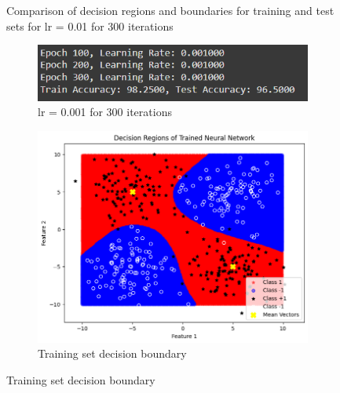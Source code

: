 \documentclass[a4paper,12pt]{article}
\begin{document}
\begin{figure}[H]
    \caption{Comparison of decision regions and boundaries for training and test sets for lr = 0.01 for 300 iterations}
\end{figure}

\begin{figure}[H]
    \centering
    \captionsetup[subfigure]{list=true} %

    \begin{subfigure}{0.5\textwidth}
        \centering
        \includegraphics[width=\textwidth]{3.3_.001_300_r.png}
        \caption{lr = 0.001 for 300 iterations}
    \end{subfigure}
    \begin{subfigure}{0.45\textwidth}
        \centering
        \includegraphics[width=\textwidth]{3.3_.001_300_Train.png}
        \caption{Training set decision boundary}
    \end{subfigure}


\end{figure}
\end{document}
